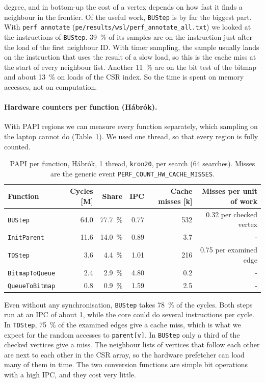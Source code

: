 degree, and in bottom-up the cost of a vertex depends on how fast it finds a neighbour in
the frontier. Of the useful work, \texttt{BUStep} is by far the biggest part. With
\texttt{perf annotate} (\texttt{pe/results/wsl/perf\_annotate\_all.txt}) we looked at the
instructions of \texttt{BUStep}. \SI{39}{\percent} of its samples are on the instruction just
after the load of the first neighbour ID. With timer sampling, the sample usually lands on
the instruction that uses the result of a slow load, so this is the cache miss at the start
of every neighbour list. Another \SI{11}{\percent} are on the bit test of the bitmap and about
\SI{13}{\percent} on loads of the CSR index. So the time is spent on memory accesses, not on
computation.

\paragraph{Hardware counters per function (Hábrók).} With PAPI regions we can measure every
function separately, which sampling on the laptop cannot do (Table~\ref{tab:papi}). We used one
thread, so that every region is fully counted.
\begin{table}[ht]
\centering\small
\caption{PAPI per function, Hábrók, 1 thread, \texttt{kron20}, per search (64 searches).
Misses are the generic event \texttt{PERF\_COUNT\_HW\_CACHE\_MISSES}.}
\label{tab:papi}
\begin{tabular}{@{}lrrrrr@{}}
\toprule
Function & Cycles [M] & Share & IPC & Cache misses [k] & Misses per unit of work \\
\midrule
\texttt{BUStep} & 64.0 & \SI{77.7}{\percent} & 0.77 & 532 & 0.32 per checked vertex \\
\texttt{InitParent} & 11.6 & \SI{14.0}{\percent} & 0.89 & 3.7 & - \\
\texttt{TDStep} & 3.6 & \SI{4.4}{\percent} & 1.01 & 216 & 0.75 per examined edge \\
\texttt{BitmapToQueue} & 2.4 & \SI{2.9}{\percent} & 4.80 & 0.2 & - \\
\texttt{QueueToBitmap} & 0.8 & \SI{0.9}{\percent} & 1.59 & 2.5 & - \\
\bottomrule
\end{tabular}
\end{table}
Even without any synchronisation, \texttt{BUStep} takes \SI{78}{\percent} of the cycles. Both
steps run at an IPC of about 1, while the core could do several instructions per cycle. In
\texttt{TDStep}, \SI{75}{\percent} of the examined edges give a cache miss, which is what we
expect for the random accesses to \texttt{parent[v]}. In \texttt{BUStep} only a third of the
checked vertices give a miss. The neighbour lists of vertices that follow each other are next
to each other in the CSR array, so the hardware prefetcher can load many of them in time. The
two conversion functions are simple bit operations with a high IPC, and they cost very little.

